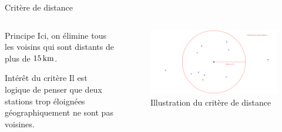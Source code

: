 \begin{frame}{Critère de distance}
    \begin{columns}
        \begin{column}{0.4\paperwidth}
            \begin{block}{Principe}
                Ici, on élimine tous les voisins qui sont distants de plus de $\unit[15]{km}$.
            \end{block}
            \begin{block}{Intérêt du critère}
                Il est logique de penser que deux stations trop éloignées géographiquement ne sont pas voisines.
            \end{block}
        \end{column}
        \begin{column}{0.55\paperwidth}
            \begin{figure}
                \includegraphics[width=0.5\paperwidth]{images/criteria_illustrations/distance.png}
                \caption{\label{fig:distance_crit}Illustration du critère de distance}
            \end{figure}
        \end{column}
    \end{columns}
\end{frame}

